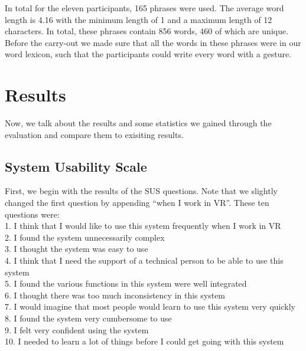 In total for the eleven participants, 165 phrases were used. The average word length is 4.16 with the minimum length of 1 and a maximum length of 12 characters. In total, these phrases contain 856 words, 460 of which are unique. Before the carry-out we made sure that all the words in these phrases were in our word lexicon, such that the participants could write every word with a gesture.
\section{Results}
Now, we talk about the results and some statistics we gained through the evaluation and compare them to exisiting results.\\

\subsection{System Usability Scale}
First, we begin with the results of the SUS questions. Note that we slightly changed the first question by appending ``when I work in VR''. These ten questions were:\\
1. I think that I would like to use this system frequently when I work in VR\\
2. I found the system unnecessarily complex\\
3. I thought the system was easy to use \\
4. I think that I need the support of a technical person to be able to use this system\\
5. I found the various functions in this system were well integrated\\
6. I thought there was too much inconsistency in this system\\
7. I would imagine that most people would learn to use this system very quickly\\
8. I found the system very cumbersome to use\\
9. I felt very confident using the system\\
10. I needed to learn a lot of things before I could get going with this system
\iffalse
